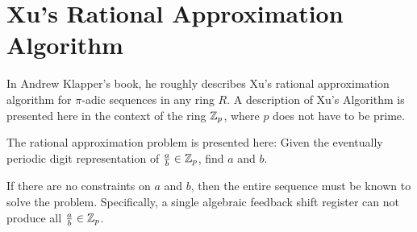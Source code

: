 \section{Xu's Rational Approximation Algorithm}
\par In Andrew Klapper's book, he roughly describes Xu's rational approximation
algorithm for $\pi$-adic sequences in any ring $R$. A description of Xu's Algorithm
is presented here in the context of the ring $\mathbb{Z}_p$, where $p$ does not have to be prime.

\par The rational approximation problem is presented here: Given the eventually
periodic digit representation of $\frac{a}{b}\in\mathbb{Z}_p$, find $a$ and $b$.

\par If there are no constraints on $a$ and $b$, then the entire sequence must be known
to solve the problem. Specifically, a single algebraic feedback shift register can
not produce all $\frac{a}{b}\in\mathbb{Z}_p$.
